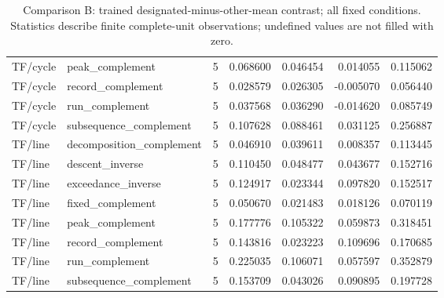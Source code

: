 \begin{table}[p]
\begin{tabular}{llrrrrr}
TF/cycle & peak\_complement & 5 & 0.068600 & 0.046454 & 0.014055 & 0.115062\\
TF/cycle & record\_complement & 5 & 0.028579 & 0.026305 & -0.005070 & 0.056440\\
TF/cycle & run\_complement & 5 & 0.037568 & 0.036290 & -0.014620 & 0.085749\\
TF/cycle & subsequence\_complement & 5 & 0.107628 & 0.088461 & 0.031125 & 0.256887\\
TF/line & decomposition\_complement & 5 & 0.046910 & 0.039611 & 0.008357 & 0.113445\\
TF/line & descent\_inverse & 5 & 0.110450 & 0.048477 & 0.043677 & 0.152716\\
TF/line & exceedance\_inverse & 5 & 0.124917 & 0.023344 & 0.097820 & 0.152517\\
TF/line & fixed\_complement & 5 & 0.050670 & 0.021483 & 0.018126 & 0.070119\\
TF/line & peak\_complement & 5 & 0.177776 & 0.105322 & 0.059873 & 0.318451\\
TF/line & record\_complement & 5 & 0.143816 & 0.023223 & 0.109696 & 0.170685\\
TF/line & run\_complement & 5 & 0.225035 & 0.106071 & 0.057597 & 0.352879\\
TF/line & subsequence\_complement & 5 & 0.153709 & 0.043026 & 0.090895 & 0.197728\\
\bottomrule\end{tabular}
\caption{Comparison B: trained designated-minus-other-mean contrast; all fixed conditions. Statistics describe finite complete-unit observations; undefined values are not filled with zero.}
\label{tab:independent-effect-3}\end{table}
